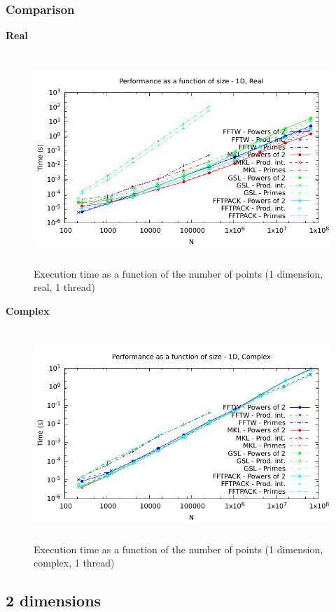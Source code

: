 \documentclass[12pt, a4paper]{article}
\begin{document}
\subsubsection{Comparison}
{\bf Real}
\begin{figure}[H]
\captionsetup{width=0.6\textwidth}
\centering
\includegraphics[height=8cm]{graphs/performance/1d-r.pdf}
\caption{Execution time as a function of the number of points (1 dimension, real, 1 thread)}
\label{1DR}
\end{figure}
{\bf Complex}
\begin{figure}[H]
\captionsetup{width=0.6\textwidth}
\centering
\includegraphics[height=8cm]{graphs/performance/1d-c.pdf}
\caption{Execution time as a function of the number of points (1 dimension, complex, 1 thread)}
\label{1DC}
\end{figure}

\subsection{2 dimensions}
\end{document}
